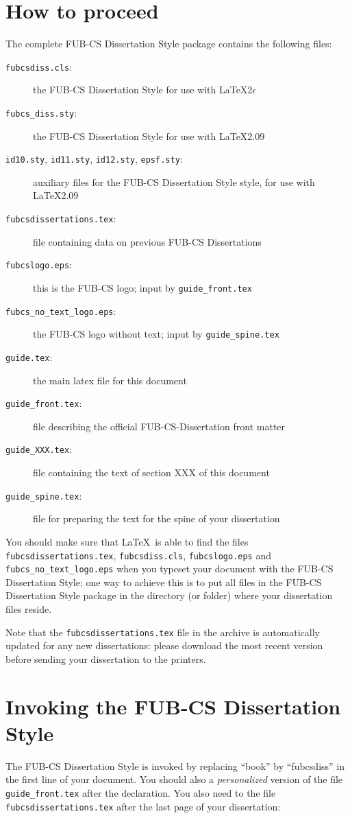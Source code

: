 \section{How to proceed}
The complete FUB-CS Dissertation Style package contains the following files:
\begin{description} 
\item[{\tt fubcsdiss.cls}:] the FUB-CS Dissertation Style for
use with \LaTeX 2$\epsilon$
\item[{\tt fubcs\_diss.sty}:] the FUB-CS Dissertation Style for
use with \LaTeX 2.09
\item[{\tt id10.sty}, {\tt id11.sty}, {\tt id12.sty}, {\tt epsf.sty}:] 
  auxiliary files for the FUB-CS Dissertation Style style,
  for use with \LaTeX 2.09
\item[{\tt fubcsdissertations.tex}:] file containing data on previous
  FUB-CS Dissertations
\item[{\tt fubcslogo.eps}:] this is the FUB-CS logo;
  input by {\tt guide\_front.tex}
\item[{\tt fubcs\_no\_text\_logo.eps}:] the FUB-CS logo without text;
  input by {\tt guide\_spine.tex}
\item[{\tt guide.tex}:] the main latex file for this document
\item[{\tt guide\_front.tex}:] file describing the official 
  FUB-CS-Dissertation front matter
\item[{\tt guide\_XXX.tex}:] file containing the text of section XXX of this 
document
\item[{\tt guide\_spine.tex}:] file for preparing the text 
  for the spine of your dissertation
\end{description}
You should make sure that \LaTeX\ is able to find the files
{\tt fubcsdissertations.tex}, {\tt fubcsdiss.cls}, {\tt fubcslogo.eps} and
{\tt fubcs\_no\_text\_logo.eps} when you 
typeset your document with the FUB-CS Dissertation Style; one way
to achieve this is to put all files in the FUB-CS Dissertation Style
package in the directory (or folder) where your dissertation files
reside.

Note that the {\tt fubcsdissertations.tex}
file in the archive is automatically updated for any new dissertations:
please download the most recent version 
before sending your dissertation to the printers.

\section{Invoking the FUB-CS Dissertation Style}
The FUB-CS Dissertation Style is invoked by replacing ``book'' by ``fubcsdiss''
in the first line of your document. You should also \verb|| 
a {\em personalized\/} version of the file {\tt guide\_front.tex} 
after the \verb|| declaration. 
You also need to \verb|| the file
\verb|fubcsdissertations.tex| after the last page of your dissertation:

